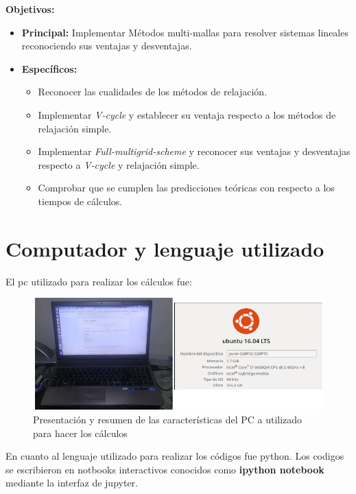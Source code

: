 \documentclass[letter,10pt]{article}
\begin{document}
{\bf\Large Objetivos:}\\
\begin{itemize}
\item {\bf Principal:} Implementar Métodos multi-mallas para resolver sistemas lineales reconociendo sus ventajas y desventajas.\\
\item {\bf Específicos:}
\begin{itemize}
\item Reconocer las cualidades de los métodos de relajación.
\item Implementar {\it V-cycle} y establecer su ventaja respecto a los métodos de relajación simple.
\item Implementar {\it Full-multigrid-scheme} y reconocer sus ventajas y desventajas respecto a {\it V-cycle} y relajación simple.
\item Comprobar que se cumplen las predicciones teóricas con respecto a los tiempos de cálculos.
\end{itemize}
\end{itemize}

\newpage

\tableofcontents

\newpage

\section{Computador y lenguaje utilizado}

El pc utilizado para realizar los cálculos fue:

\begin{figure}[H]
\centering
\includegraphics[scale=0.8]{img/mipc2.png}
\caption{Presentación y resumen de las características del PC a utilizado para hacer los cálculos}
\label{mipc}
\end{figure}

En cuanto al lenguaje utilizado para realizar los códigos fue python. Los codigos se escribieron en notbooks interactivos conocidos como {\bf ipython notebook} mediante la interfaz de jupyter.
\end{document}
